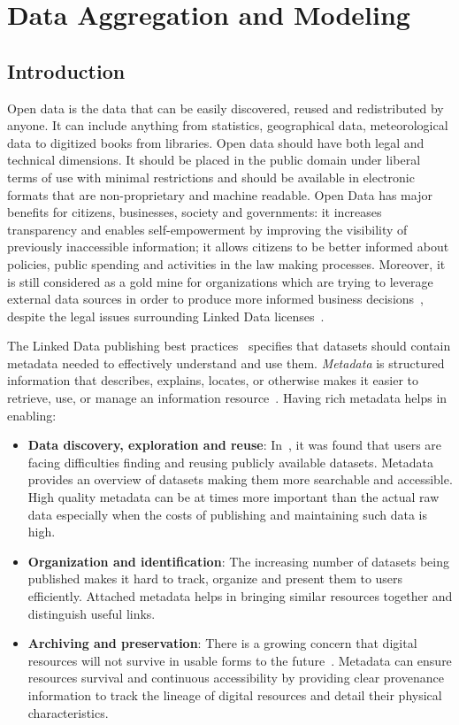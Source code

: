 \chapter{Data Aggregation and Modeling}\label{chapter:data-aggregation}

\section{Introduction}
Open data is the data that can be easily discovered, reused and redistributed by anyone. It can include anything from statistics, geographical data, meteorological data to digitized books from libraries. Open data should have both legal and technical dimensions. It should be placed in the public domain under liberal terms of use with minimal restrictions and should be available in electronic formats that are non-proprietary and machine readable. Open Data has major benefits for citizens, businesses, society and governments: it increases transparency and enables self-empowerment by improving the visibility of previously inaccessible information; it allows citizens to be better informed about policies, public spending and activities in the law making processes. Moreover, it is still considered as a gold mine for organizations which are trying to leverage external data sources in order to produce more informed business decisions~\cite{Boyd:Article:11}, despite the legal issues surrounding Linked Data licenses~\cite{Prateek:Misc:13}.

The Linked Data publishing best practices~\cite{Bizer:DB:11} specifies that datasets should contain metadata needed to effectively understand and use them. \textit{Metadata} is structured information that describes, explains, locates, or otherwise makes it easier to retrieve, use, or manage an information resource~\cite{NISO:TechReport:04}. Having rich metadata helps in enabling:
\begin{itemize}
  \item \textbf{Data discovery, exploration and reuse}: In~\cite{Graham:TechReport:11}, it was found that users are facing difficulties finding and reusing publicly available datasets. Metadata provides an overview of datasets making them more searchable and accessible. High quality metadata can be at times more important than the actual raw data especially when the costs of publishing and maintaining such data is high.
  \item \textbf{Organization and identification}: The increasing number of datasets being published makes it hard to track, organize and present them to users efficiently. Attached metadata helps in bringing similar resources together and distinguish useful links.
  \item \textbf{Archiving and preservation}: There is a growing concern that digital resources will not survive in usable forms to the future~\cite{NISO:TechReport:04}. Metadata can ensure resources survival and continuous accessibility by providing clear provenance information to track the lineage of digital resources and detail their physical characteristics.
\end{itemize}

